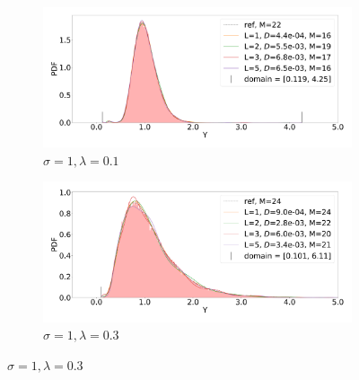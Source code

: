 \documentclass{article}
\begin{document}
\begin{figure}[!htp]
    \centering 
\begin{subfigure}{0.5\textwidth}
  \includegraphics[width=\linewidth]{porous_media_flow/MLMC/cl_0_1_s_1.pdf}
  \caption{$\sigma = 1, \lambda=0.1$}
  \label{fig:cl_0_1_s_1}
\end{subfigure}\hfil 
\begin{subfigure}{0.5\textwidth}
  \includegraphics[width=\linewidth]{porous_media_flow/MLMC/cl_0_3_s_1.pdf}
  \caption{$\sigma = 1, \lambda=0.3$}
  \label{fig:cl_0_3_s_1}
\end{subfigure}\hfil 


\end{figure}
\end{document}

